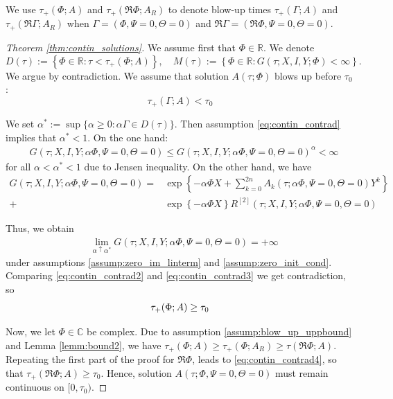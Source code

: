 \documentclass[pdftex,11pt,a4paper] {article}
\begin{document}
We use $\tau_+(\Phi;A)$ and $\tau_+(\Re\Phi;A_R)$ to denote blow-up times $\tau_+(\Gamma;A)$ and $\tau_+(\Re\Gamma;A_R)$ when $\Gamma=(\Phi, \Psi=0, \Theta=0)$ and $\Re\Gamma=(\Re\Phi, \Psi=0, \Theta=0)$. 



\begin{proof}[Theorem \ref{thm:contin_solutions}]
We assume first that $\Phi\in \mathbb{R}$. We denote
\begin{equation*}
D(\tau):=\left\{\Phi\in \mathbb{R} : \tau < \tau_+(\Phi;A)\right\},\quad 
M(\tau):=\left\{\Phi\in \mathbb{R} : G(\tau; X,I,Y; \Phi)<\infty\right\}.
\end{equation*}
We argue by contradiction. We assume that solution $A(\tau;\Phi)$ blows up before $\tau_0$:
\begin{equation}\label{eq:contin_contrad}
\tau_+(\Gamma; A)<\tau_0
\end{equation}

We set $\alpha^*:=\sup\{\alpha\ge 0: \alpha\Gamma\in D(\tau)\}$. Then assumption \eqref{eq:contin_contrad} implies that $\alpha^*<1$. On the one hand:
\begin{equation}\label{eq:contin_contrad2}
\begin{split}
&G(\tau;X,I,Y; \alpha\Phi,\Psi=0,\Theta=0)\le G(\tau;X,I,Y; \alpha\Phi,\Psi=0,\Theta=0)^\alpha <\infty
\end{split}
\end{equation}
for all $\alpha<\alpha^*<1$ due to Jensen inequality. On the other hand, we have
\begin{equation*}
\begin{split}
G(\tau;X,I,Y; \alpha\Phi,\Psi=0,\Theta=0)=&\exp\left\{-\alpha\Phi X+\sum_{k=0}^{2n} A_k(\tau;\alpha\Phi,\Psi=0,\Theta=0)Y^k\right\}\\
+ &\exp\left\{-\alpha\Phi X\right\}R^{[2]}(\tau;X,I,Y;\alpha\Phi,\Psi=0,\Theta=0)
\end{split}
\end{equation*}

Thus, we obtain
\begin{equation}\label{eq:contin_contrad3}
\begin{split}
&\lim_{\alpha\uparrow\alpha^*}G(\tau;X,I,Y; \alpha\Phi,\Psi=0,\Theta=0)=+\infty
\end{split}
\end{equation}
under assumptions \ref{assump:zero_im_linterm} and \ref{assump:zero_init_cond}. Comparing \eqref{eq:contin_contrad2} and \eqref{eq:contin_contrad3} we get contradiction, so
\begin{equation}\label{eq:contin_contrad4}
\tau_+(\Phi;A)\ge \tau_0\vspace*{-0.5\baselineskip}
\end{equation}


Now, we let $\Phi\in \mathbb{C}$ be complex. Due to assumption \ref{assump:blow_up_uppbound} and Lemma \ref{lemm:bound2}, we have 
$
\tau_+(\Phi;A)\ge \tau_+(\Phi; A_R)\ge \tau(\Re\Phi;A). 
$
Repeating the first part of the proof for $\Re\Phi$, leads to \eqref{eq:contin_contrad4}, so that 
$
\tau_+(\Re\Phi;A)\ge \tau_0. 
$
Hence, solution $A(\tau;\Phi,\Psi=0,\Theta=0)$ must remain continuous on $[0,\tau_0)$. 
\end{proof}
\end{document}

